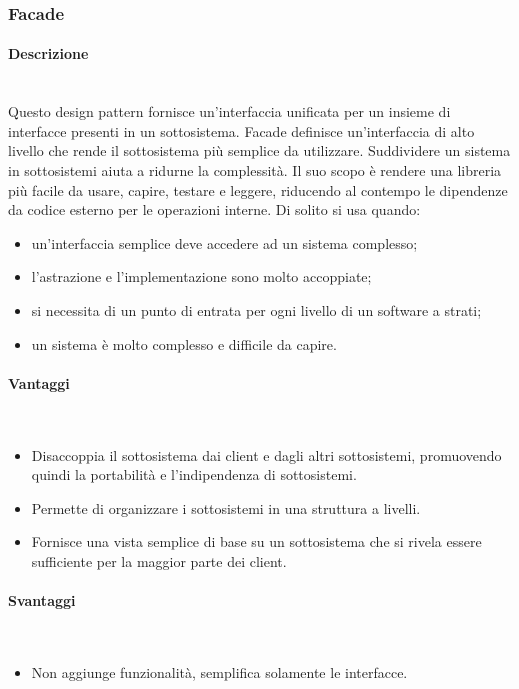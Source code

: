 \subsubsection{Facade}
\paragraph{Descrizione} \mbox{} \\
Questo design pattern fornisce un'interfaccia unificata per un insieme di interfacce presenti in un sottosistema. Facade definisce un'interfaccia di alto livello che rende il sottosistema più semplice da utilizzare. Suddividere un sistema in sottosistemi aiuta a ridurne la complessità. Il suo scopo è rendere una libreria più facile da usare, capire, testare e leggere, riducendo al contempo le dipendenze da codice esterno per le operazioni interne. Di solito si usa quando:
\begin{itemize}
\item un'interfaccia semplice deve accedere ad un sistema complesso;
\item l'astrazione e l'implementazione sono molto accoppiate;
\item si necessita di un punto di entrata per ogni livello di un software a strati;
\item un sistema è molto complesso e difficile da capire.
\end{itemize}
\paragraph{Vantaggi} \mbox{} \\
\begin{itemize}
\item Disaccoppia il sottosistema dai client e dagli altri sottosistemi, promuovendo quindi la portabilità e l'indipendenza di sottosistemi.
\item Permette di organizzare i sottosistemi in una struttura a livelli.
\item Fornisce una vista semplice di base su un sottosistema che si rivela essere sufficiente per la maggior parte dei client.
\end{itemize}
\paragraph{Svantaggi} \mbox{} \\
\begin{itemize}
\item Non aggiunge funzionalità, semplifica solamente le interfacce.
\end{itemize}
